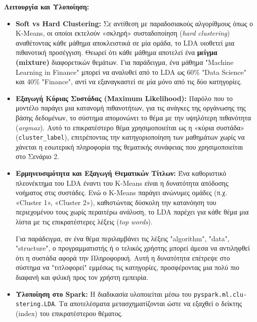 \documentclass[a4paper,12pt]{article}
\begin{document}
\textbf{Λειτουργία και Υλοποίηση:} 
\begin{itemize} 
    \item \textbf{Soft vs Hard Clustering:} Σε αντίθεση με παραδοσιακούς αλγορίθμους όπως ο K-Means, οι οποίοι εκτελούν «σκληρή» συσταδοποίηση (\textit{hard clustering}) αναθέτοντας κάθε μάθημα αποκλειστικά σε μία ομάδα, το LDA υιοθετεί μια πιθανοτική προσέγγιση. Θεωρεί ότι κάθε μάθημα αποτελεί ένα \textbf{μείγμα (mixture)} διαφορετικών θεμάτων. Για παράδειγμα, ένα μάθημα "Machine Learning in Finance" μπορεί να αναλυθεί από το LDA ως 60\% "Data Science" και 40\% "Finance", αντί να εξαναγκαστεί σε μία μόνο από τις δύο κατηγορίες.

    \item \textbf{Εξαγωγή Κύριας Συστάδας (Maximum Likelihood):} Παρόλο που το μοντέλο παράγει μια κατανομή πιθανοτήτων, για τις ανάγκες της οργάνωσης της βάσης δεδομένων, το σύστημα απομονώνει το θέμα με την υψηλότερη πιθανότητα (\textit{argmax}). Αυτό το επικρατέστερο θέμα χρησιμοποιείται ως η «κύρια συστάδα» (\texttt{cluster\_label}), επιτρέποντας την κατηγοριοποίηση των μαθημάτων χωρίς να χάνεται η εσωτερική πληροφορία της θεματικής συνάφειας που χρησιμοποιείται στο Σενάριο 2.

    \item \textbf{Ερμηνευσιμότητα και Εξαγωγή Θεματικών Τίτλων:} Ένα καθοριστικό πλεονέκτημα του LDA έναντι του K-Means είναι η δυνατότητα απόδοσης νοήματος στις συστάδες. Ενώ ο K-Means παράγει ανώνυμες ομάδες (π.χ. «Cluster 1», «Cluster 2»), καθιστώντας δύσκολη την κατανόηση του περιεχομένου τους χωρίς περαιτέρω ανάλυση, το LDA παρέχει για κάθε θέμα μια λίστα με τις επικρατέστερες λέξεις (\textit{top words}). 

    Για παράδειγμα, αν ένα θέμα περιλαμβάνει τις λέξεις "algorithm", "data", "structure", ο προγραμματιστής ή ο τελικός χρήστης μπορεί άμεσα να αντιληφθεί ότι η συστάδα αφορά την Πληροφορική. Αυτή η δυνατότητα επέτρεψε στο σύστημα να "τιτλοφορεί" εμμέσως τις κατηγορίες, προσφέροντας μια πολύ πιο διαφανή και φιλική προς τον χρήστη εμπειρία.
    
    \item \textbf{Υλοποίηση στο Spark:} Η διαδικασία υλοποιείται μέσω του \texttt{pyspark.ml.clu-} \texttt{stering.LDA}. Τα αποτελέσματα μετασχηματίζονται ώστε να εξαχθεί ο δείκτης (index) του επικρατέστερου θέματος. 
\end{itemize}
\end{document}

